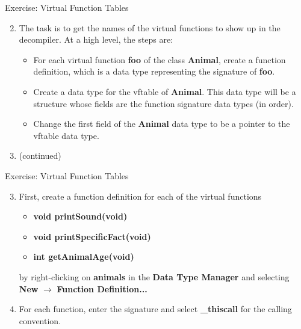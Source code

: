 \documentclass{beamer}
\begin{document}
\begin{frame}
\begin{block}{Exercise: Virtual Function Tables}
\begin{enumerate}
\setcounter{enumi}{1}
\item The task is to get the names of the virtual functions to show up in the decompiler. At a high level, the steps are:
\begin{itemize}
\item For each virtual function \textbf{foo} of the class \textbf{Animal}, create a function definition, which is a data type representing the signature of \textbf{foo}.
\item Create a data type for the vftable of \textbf{Animal}. This data type will be a structure whose fields are the function signature data types (in order).
\item Change the first field of the \textbf{Animal} data type to be a pointer to the vftable data type.
\end{itemize}
\item[] (continued)
\end{enumerate}
\end{block}
\end{frame}

\begin{frame}
\begin{block}{Exercise: Virtual Function Tables}
\begin{enumerate}
\setcounter{enumi}{2}
\item First, create a function definition for each of the virtual functions 
\begin{itemize}
\item \textbf{void printSound(void)}
\item \textbf{void printSpecificFact(void)}
\item \textbf{int getAnimalAge(void)}
\end{itemize}
by right-clicking on \textbf{animals} in the \textbf{Data Type Manager} and selecting \textbf{New} $\rightarrow$ \textbf{Function Definition...} 
\item[] For each function, enter the signature and select \textbf{\_thiscall} for the calling convention. 
\end{enumerate}
\end{block}
\end{frame}
\end{document}
